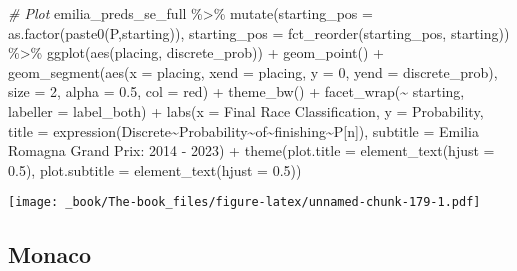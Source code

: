 \documentclass[
]{book}
\newenvironment{Shaded}{\begin{snugshade}}{\end{snugshade}}
\newcommand{\AttributeTok}[1]{\textcolor[rgb]{0.77,0.63,0.00}{#1}}
\newcommand{\CommentTok}[1]{\textcolor[rgb]{0.56,0.35,0.01}{\textit{#1}}}
\newcommand{\DecValTok}[1]{\textcolor[rgb]{0.00,0.00,0.81}{#1}}
\newcommand{\FloatTok}[1]{\textcolor[rgb]{0.00,0.00,0.81}{#1}}
\newcommand{\FunctionTok}[1]{\textcolor[rgb]{0.00,0.00,0.00}{#1}}
\newcommand{\NormalTok}[1]{#1}
\newcommand{\SpecialCharTok}[1]{\textcolor[rgb]{0.00,0.00,0.00}{#1}}
\newcommand{\StringTok}[1]{\textcolor[rgb]{0.31,0.60,0.02}{#1}}
\begin{document}
\begin{Shaded}
\begin{Highlighting}[]
\CommentTok{\# Plot}
\NormalTok{emilia\_preds\_se\_full }\SpecialCharTok{\%\textgreater{}\%}
  \FunctionTok{mutate}\NormalTok{(}\AttributeTok{starting\_pos =} \FunctionTok{as.factor}\NormalTok{(}\FunctionTok{paste0}\NormalTok{(}\StringTok{\textquotesingle{}P\textquotesingle{}}\NormalTok{,starting)),}
         \AttributeTok{starting\_pos =} \FunctionTok{fct\_reorder}\NormalTok{(starting\_pos, starting)) }\SpecialCharTok{\%\textgreater{}\%}
  \FunctionTok{ggplot}\NormalTok{(}\FunctionTok{aes}\NormalTok{(placing, discrete\_prob)) }\SpecialCharTok{+}
  \FunctionTok{geom\_point}\NormalTok{() }\SpecialCharTok{+}
  \FunctionTok{geom\_segment}\NormalTok{(}\FunctionTok{aes}\NormalTok{(}\AttributeTok{x =}\NormalTok{ placing, }\AttributeTok{xend =}\NormalTok{ placing, }\AttributeTok{y =} \DecValTok{0}\NormalTok{, }\AttributeTok{yend =}\NormalTok{ discrete\_prob),}
               \AttributeTok{size =} \DecValTok{2}\NormalTok{, }\AttributeTok{alpha =} \FloatTok{0.5}\NormalTok{, }\AttributeTok{col =} \StringTok{\textquotesingle{}red\textquotesingle{}}\NormalTok{) }\SpecialCharTok{+}
  \FunctionTok{theme\_bw}\NormalTok{() }\SpecialCharTok{+}
  \FunctionTok{facet\_wrap}\NormalTok{(}\SpecialCharTok{\textasciitilde{}}\NormalTok{ starting, }\AttributeTok{labeller =}\NormalTok{ label\_both) }\SpecialCharTok{+}
  \FunctionTok{labs}\NormalTok{(}\AttributeTok{x =} \StringTok{\textquotesingle{}Final Race Classification\textquotesingle{}}\NormalTok{,}
       \AttributeTok{y =} \StringTok{\textquotesingle{}Probability\textquotesingle{}}\NormalTok{,}
       \AttributeTok{title =} \FunctionTok{expression}\NormalTok{(Discrete}\SpecialCharTok{\textasciitilde{}}\NormalTok{Probability}\SpecialCharTok{\textasciitilde{}}\NormalTok{of}\SpecialCharTok{\textasciitilde{}}\NormalTok{finishing}\SpecialCharTok{\textasciitilde{}}\NormalTok{P[n]),}
       \AttributeTok{subtitle =} \StringTok{\textquotesingle{}Emilia Romagna Grand Prix: 2014 {-} 2023\textquotesingle{}}\NormalTok{) }\SpecialCharTok{+}
  \FunctionTok{theme}\NormalTok{(}\AttributeTok{plot.title =} \FunctionTok{element\_text}\NormalTok{(}\AttributeTok{hjust =} \FloatTok{0.5}\NormalTok{),}
        \AttributeTok{plot.subtitle =} \FunctionTok{element\_text}\NormalTok{(}\AttributeTok{hjust =} \FloatTok{0.5}\NormalTok{)) }
\end{Highlighting}
\end{Shaded}

\texttt{[image: \_book/The-book\_files/figure-latex/unnamed-chunk-179-1.pdf]}

\hypertarget{monaco-1}{%
\subsection{Monaco}\label{monaco-1}}
\end{document}
